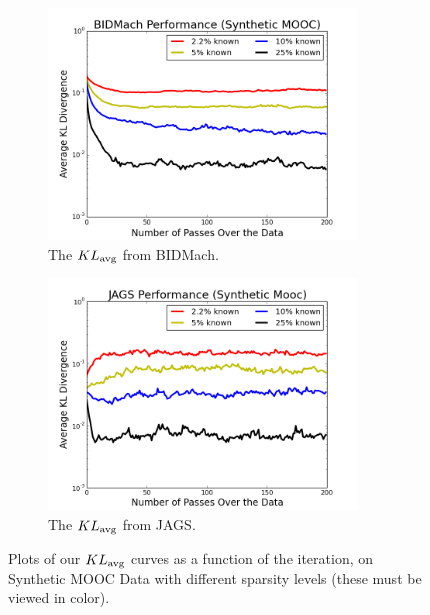 \documentclass{article} %
\begin{document}
\begin{figure}[t]
\centering
\begin{subfigure}{.5\textwidth}
  \centering
  \includegraphics[width=0.9\textwidth]{fig_diff_sparsity_bidmach}
  \caption{The $KL_{\rm avg}$ from BIDMach.}
  \label{fig:kl_time_bidmach}
\end{subfigure}%
\begin{subfigure}{.5\textwidth}
  \centering
  \includegraphics[width=0.9\textwidth]{fig_diff_sparsity_jags}
  \caption{The $KL_{\rm avg}$ from JAGS.}
  \label{fig:kl_time_jags}
\end{subfigure}
\caption{Plots of our $KL_{\rm avg}$ curves as a function of the iteration, on Synthetic MOOC Data
with different sparsity levels (these must be viewed in color).}
\label{fig:second_set}
\end{figure}
\end{document}
